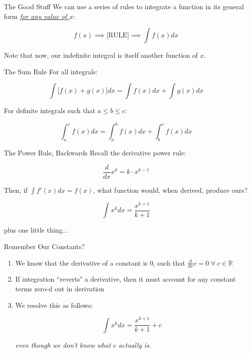 \documentclass[10pt]{beamer}
\begin{document}
\begin{frame}{The Good Stuff}
    We can use a series of rules to integrate a function in its general form \textit{\underline{for any value of $x$}}:

    \[f(x) \implies \text{[RULE]} \implies \int f(x) dx\]

    Note that now, our indefinite integral is itself another function of $x$.
\end{frame}

\begin{frame}{The Sum Rule}
    For all integrals:

    \[\int \Big[f(x) + g(x)\Big] dx  = \int f(x) dx + \int g(x) dx\]

    For definite integrals such that $a \leq b \leq c$:

    \[\int_a^c f(x) dx = \int_a^b f(x) dx + \int_b^c f(x)dx\]
\end{frame}

\begin{frame}{The Power Rule, Backwards}
    Recall the derivative power rule:

    \[\frac{d}{dx} x^k = k \cdot x^{k-1}\]

    Then, if $\int f'(x) dx = f(x)$, what function would, when derived, produce ours? \pause

    \[\int x^k dx = \frac{x^{k+1}}{k+1}\]

    plus one little thing...
\end{frame}

\begin{frame}{Remember Our Constants?}
    \begin{enumerate}
        \item We know that the derivative of a constant is $0$, such that $\frac{d}{dx} c = 0 \; \forall \; c \in \mathbb{R}$
        \item If integration ``reverts" a derivative, then it must account for any constant terms zero-d out in derivation
        \item We resolve this as follows:

        \[\int x^k dx = \frac{x^{k+1}}{k+1} + c\]

         \textit{even though we don't know what $c$ actually is.}
    \end{enumerate}
\end{frame}
\end{document}
